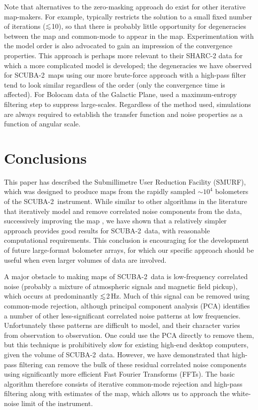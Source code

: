 \documentclass[useAMS,usenatbib,nofootinbib]{mn2e}
\newcommand{\scuba}{SCUBA-2}
\def\lsim{\mathrel{\lower2.5pt\vbox{\lineskip=0pt\baselineskip=0pt
          \hbox{$<$}\hbox{$\sim$}}}}
\begin{document}
Note that alternatives to the zero-masking approach do exist for other
iterative map-makers. For example, \citet{kovacs2008} typically
restricts the solution to a small fixed number of iterations
($\lsim$10), so that there is probably little opportunity for
degeneracies between the map and common-mode to appear in the map.
Experimentation with the model order is also advocated to gain an
impression of the convergence properties. This approach is perhaps
more relevant to their SHARC-2 data for which a more complicated model
is developed; the degeneracies we have observed for \scuba\ maps using
our more brute-force approach with a high-pass filter tend to look
similar regardless of the order (only the convergence time is
affected).  For Bolocam data of the Galactic Plane,
\citet{aguirre2011} used a maximum-entropy filtering step to suppress
large-scales. Regardless of the method used, simulations are always
required to establish the transfer function and noise properties as a
function of angular scale.


\section{Conclusions}
\label{sec:conclusions}

This paper has described the Submillimetre User Reduction Facility
(SMURF), which was designed to produce maps from the rapidly sampled
$\sim10^4$ bolometers of the \scuba\ instrument. While similar to
other algorithms in the literature that iteratively model and remove
correlated noise components from the data, successively improving the
map \citep[e.g.,][]{kovacs2008,siringo2009,aguirre2011}, we have shown
that a relatively simpler approach provides good results for \scuba\
data, with reasonable computational requirements. This conclusion is
encouraging for the development of future large-format bolometer
arrays, for which our specific approach should be useful when even
larger volumes of data are involved.

A major obstacle to making maps of \scuba\ data is low-frequency
correlated noise (probably a mixture of atmospheric signals and
magnetic field pickup), which occurs at predominantly $\lsim$2\,Hz.
Much of this signal can be removed using common-mode rejection,
although principal component analysis (PCA) identifies a number of
other less-significant correlated noise patterns at low
frequencies. Unfortunately these patterns are difficult to model, and
their character varies from observation to observation. One could use
the PCA directly to remove them, but this technique is prohibitively
slow for existing high-end desktop computers, given the volume of
\scuba\ data. However, we have demonstrated that high-pass filtering
can remove the bulk of these residual correlated noise components
using significantly more efficient Fast Fourier Transforms (FFTs). The
basic algorithm therefore consists of iterative common-mode rejection
and high-pass filtering along with estimates of the map, which allows
us to approach the white-noise limit of the instrument.
\end{document}
